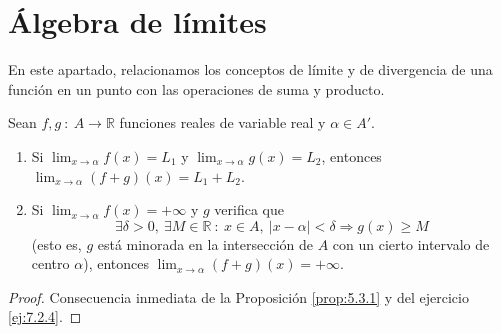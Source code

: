 \section{Álgebra de límites}
En este apartado, relacionamos los conceptos de límite y de divergencia de una función en un punto con las operaciones de suma y producto.
\begin{prop}
    Sean $f,g ~:~ A \longrightarrow \mathbb{R}$ funciones reales de variable real y $\alpha \in A'$.
    \begin{enumerate}
        \item Si $\displaystyle\lim_{x \to \alpha} f(x) = L_1$ y $\displaystyle\lim_{x \to \alpha} g(x) = L_2$, entonces $\displaystyle\lim_{x \to \alpha} (f+g)(x) = L_1 + L_2$.

        \item Si $\displaystyle\lim_{x \to \alpha} f(x) = + \infty$ y $g$ verifica que
        \begin{equation*}
            \exists \delta > 0, ~ \exists M \in \mathbb{R} ~:~ x \in A, ~ |x-\alpha| < \delta \Longrightarrow g(x) \geq M
        \end{equation*}
        (esto es, $g$ está minorada en la intersección de $A$ con un cierto intervalo de centro $\alpha$),
        entonces $\displaystyle\lim_{x \to \alpha} (f+g)(x) = + \infty$.
    \end{enumerate}
\end{prop}
\begin{proof}
    Consecuencia inmediata de la Proposición \ref{prop:5.3.1} y del ejercicio \ref{ej:7.2.4}.
\end{proof}

